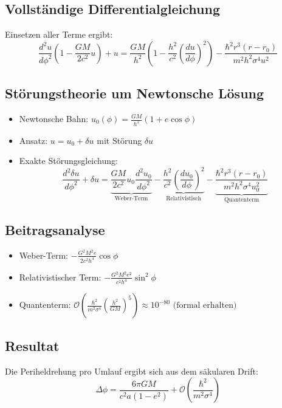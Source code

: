 \subsection{Vollständige Differentialgleichung}
Einsetzen aller Terme ergibt:
\begin{equation}
\frac{d^2 u}{d\phi^2} \left(1 - \frac{GM}{2c^2} u \right) + u = \frac{GM}{h^2} \left(1 - \frac{h^2}{c^2} \left(\frac{du}{d\phi}\right)^2 \right) - \frac{\hbar^2 r^3 (r - r_0)}{m^2 h^2 \sigma^4 u^2}
\end{equation}

\subsection{Störungstheorie um Newtonsche Lösung}
\begin{itemize}
\item Newtonsche Bahn: $u_0(\phi) = \frac{GM}{h^2}(1 + e \cos\phi)$
\item Ansatz: $u = u_0 + \delta u$ mit Störung $\delta u$
\item Exakte Störungsgleichung:
\begin{equation}
\frac{d^2 \delta u}{d\phi^2} + \delta u = \underbrace{\frac{GM}{2c^2} u_0 \frac{d^2 u_0}{d\phi^2}}_{\text{Weber-Term}} - \underbrace{\frac{h^2}{c^2} \left(\frac{du_0}{d\phi}\right)^2}_{\text{Relativistisch}} - \underbrace{\frac{\hbar^2 r^3 (r - r_0)}{m^2 h^2 \sigma^4 u_0^2}}_{\text{Quantenterm}}
\end{equation}
\end{itemize}

\subsection{Beitragsanalyse}
\begin{itemize}
\item Weber-Term: $-\frac{G^2 M^2 e}{2c^2 h^4} \cos\phi$
\item Relativistischer Term: $-\frac{G^2 M^2 e^2}{c^2 h^4} \sin^2\phi$
\item Quantenterm: $\mathcal{O}\left(\frac{\hbar^2}{m^2 \sigma^4}\left(\frac{h^2}{GM}\right)^5\right) \approx 10^{-80} \text{ (formal erhalten)}$
\end{itemize}

\subsection{Resultat}
Die Periheldrehung pro Umlauf ergibt sich aus dem säkularen Drift:
\begin{equation}
\Delta \phi = \frac{6\pi GM}{c^2 a(1 - e^2)} + \mathcal{O}\left(\frac{\hbar^2}{m^2 \sigma^4}\right)
\end{equation}

